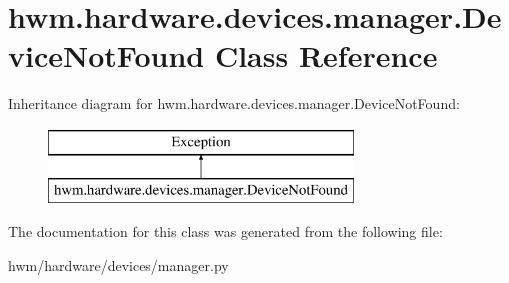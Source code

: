 \hypertarget{classhwm_1_1hardware_1_1devices_1_1manager_1_1_device_not_found}{\section{hwm.\-hardware.\-devices.\-manager.\-Device\-Not\-Found Class Reference}
\label{classhwm_1_1hardware_1_1devices_1_1manager_1_1_device_not_found}
}
Inheritance diagram for hwm.\-hardware.\-devices.\-manager.\-Device\-Not\-Found\-:\begin{figure}[H]
\begin{center}
\leavevmode
\includegraphics[height=2.000000cm]{classhwm_1_1hardware_1_1devices_1_1manager_1_1_device_not_found}
\end{center}
\end{figure}


The documentation for this class was generated from the following file\-:\begin{DoxyCompactItemize}
\item 
hwm/hardware/devices/manager.\-py\end{DoxyCompactItemize}
